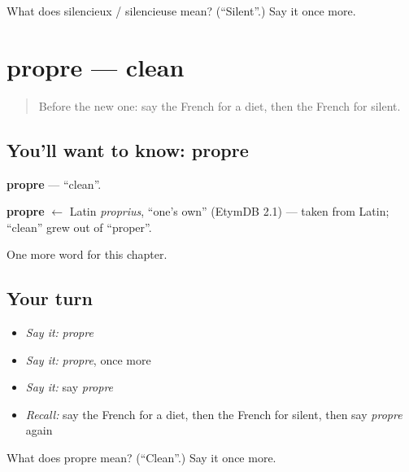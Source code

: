 \begin{tcolorbox}[breakable,colback=teal!4,colframe=teal!35!black,title={Before you move on}]
What does silencieux / silencieuse mean? (\textquotedblleft{}Silent\textquotedblright{}.) Say it once more.
\end{tcolorbox}
\section[propre]{propre — clean}

\label{lesson:FR-C244-propre}



\begin{quote}
Before the new one: say the French for a diet, then the French for silent.
\end{quote}

\subsection*{You'll want to know: propre}
\textbf{propre} — \textquotedblleft{}clean\textquotedblright{}.

\begin{cousinweb}
\textbf{propre} $\leftarrow$ Latin \emph{proprius}, \textquotedblleft{}one's own\textquotedblright{} (EtymDB 2.1) — taken from Latin; \textquotedblleft{}clean\textquotedblright{} grew out of \textquotedblleft{}proper\textquotedblright{}.
\end{cousinweb}

\begin{grammarlens}[title={What you've built}]
One more word for this chapter.
\end{grammarlens}

\subsection*{Your turn}
\begin{itemize}
\raggedright
  \item \emph{Say it:} \emph{propre}
  \item \emph{Say it:} \emph{propre}, once more
  \item \emph{Say it:} say \emph{propre}
  \item \emph{Recall:} say the French for a diet, then the French for silent, then say \emph{propre} again
\end{itemize}

\begin{tcolorbox}[breakable,colback=teal!4,colframe=teal!35!black,title={Before you move on}]
What does propre mean? (\textquotedblleft{}Clean\textquotedblright{}.) Say it once more.
\end{tcolorbox}
